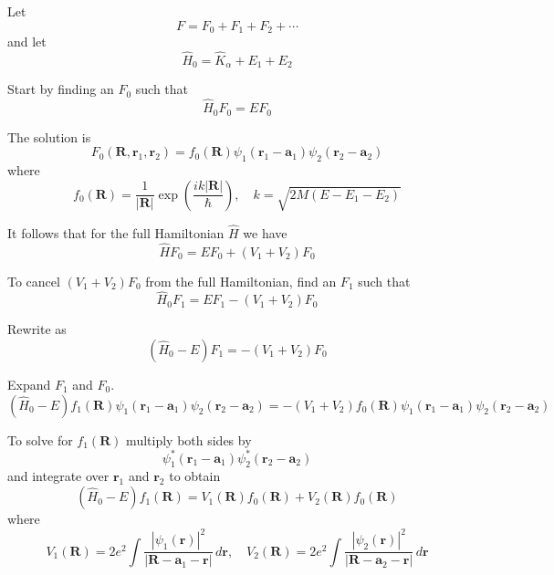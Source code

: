 Let
\begin{equation*}
F=F_0+F_1+F_2+\cdots
\end{equation*}
and let
\begin{equation*}
\hat H_0=\hat K_\alpha+E_1+E_2
\end{equation*}

Start by finding an $F_0$ such that
\begin{equation*}
\hat H_0F_0=EF_0
\end{equation*}

The solution is
\begin{equation*}
F_0(\mathbf R,\mathbf r_1,\mathbf r_2)=f_0(\mathbf R)\psi_1(\mathbf r_1-\mathbf a_1)\psi_2(\mathbf r_2-\mathbf a_2)
\tag{1}
\end{equation*}
where
\begin{equation*}
f_0(\mathbf R)=\frac{1}{|\mathbf R|}\exp\left(\frac{ik|\mathbf R|}{\hbar}\right),\quad k=\sqrt{2M(E-E_1-E_2)}
\end{equation*}

It follows that for the full Hamiltonian $\hat H$ we have
\begin{equation*}
\hat HF_0=EF_0+(V_1+V_2)F_0
\end{equation*}

To cancel $(V_1+V_2)F_0$ from the full Hamiltonian, find an $F_1$ such that
\begin{equation*}
\hat H_0F_1=EF_1-(V_1+V_2)F_0
\end{equation*}

Rewrite as
\begin{equation*}
\left(\hat H_0-E\right)F_1=-(V_1+V_2)F_0
\end{equation*}

Expand $F_1$ and $F_0$.
\begin{equation*}
\left(\hat H_0-E\right)f_1(\mathbf R)\psi_1(\mathbf r_1-\mathbf a_1)\psi_2(\mathbf r_2-\mathbf a_2)
=-(V_1+V_2)f_0(\mathbf R)\psi_1(\mathbf r_1-\mathbf a_1)\psi_2(\mathbf r_2-\mathbf a_2)
\end{equation*}

To solve for $f_1(\mathbf R)$ multiply both sides by
\begin{equation*}
\psi_1^*(\mathbf r_1-\mathbf a_1)\psi_2^*(\mathbf r_2-\mathbf a_2)
\end{equation*}
and integrate over $\mathbf r_1$ and $\mathbf r_2$ to obtain
\begin{equation*}
\left(\hat H_0-E\right)f_1(\mathbf R)
=V_1(\mathbf R)f_0(\mathbf R)+V_2(\mathbf R)f_0(\mathbf R)
\tag{2}
\end{equation*}
where
\begin{equation*}
V_1(\mathbf R)=
2e^2\int\frac{|\psi_1(\mathbf r)|^2}{|\mathbf R-\mathbf a_1-\mathbf r|}\,d\mathbf r,
\quad
V_2(\mathbf R)=
2e^2\int\frac{|\psi_2(\mathbf r)|^2}{|\mathbf R-\mathbf a_2-\mathbf r|}\,d\mathbf r
\end{equation*}

